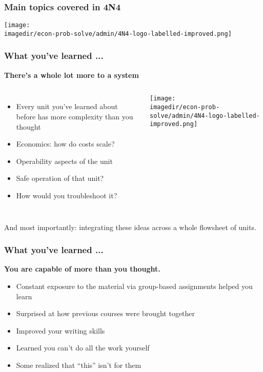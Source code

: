 \begin{frame}\frametitle{Main topics covered in 4N4}
	\begin{center}
		\texttt{[image: \\imagedir/econ-prob-solve/admin/4N4-logo-labelled-improved.png]}
	\end{center}
	\vspace{-12pt}
	{\small {\color{brown}{This is a unique course: not taught anywhere else.}}}
\end{frame}

\begin{frame}\frametitle{What you've learned ...}
	\begin{exampleblock}{}
		\begin{center}
			\textbf{\large There's a whole lot more to a system}
		\end{center}
	\end{exampleblock}
	
	\begin{columns}[t]
	
			\begin{itemize}
				\item	Every unit you've learned about before has more complexity than you thought
				\item	Economics: how do costs scale?
				\item	Operability aspects of the unit
				\item	Safe operation of that unit?
				\item	How would you troubleshoot it?
			\end{itemize}
			\vspace{-20pt}
			\begin{center}
				\texttt{[image: \\imagedir/econ-prob-solve/admin/4N4-logo-labelled-improved.png]}
			\end{center}
	\end{columns}
	
	
	\vspace{12pt}
	And most importantly: {\color{myOrange}integrating these ideas across a whole flowsheet of units.}
\end{frame}

\begin{frame}\frametitle{What you've learned ...}
	\begin{exampleblock}{}
		\begin{center}
			\textbf{\large You are capable of more than you thought.}
		\end{center}
	\end{exampleblock}
	\begin{itemize}
		\item	Constant exposure to the material via group-based assignments helped you learn
		\item	Surprised at how previous courses were brought together
		\item	Improved your writing skills
		\item	Learned you can't do all the work yourself
		\item	Some realized that ``this'' isn't for them
	\end{itemize}
\end{frame}


